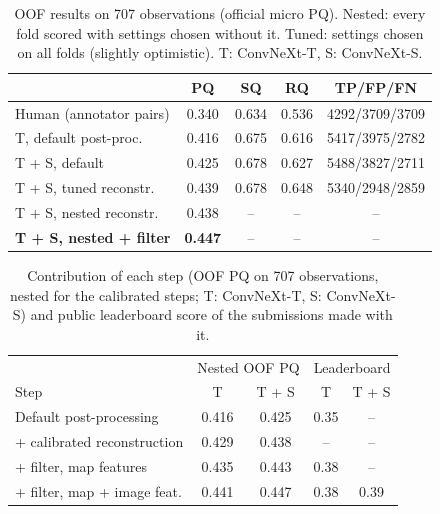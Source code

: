 \begin{table}[t]
  \caption{OOF results on 707 observations (official micro PQ). Nested:
  every fold scored with settings chosen without it. Tuned: settings chosen
  on all folds (slightly optimistic). T: ConvNeXt-T, S: ConvNeXt-S.}
  \label{tab:main}
  \small
  \setlength{\tabcolsep}{2.5pt}
  \begin{tabular}{lcccc}
    \toprule
    & PQ & SQ & RQ & TP/FP/FN \\
    \midrule
    Human (annotator pairs) & 0.340 & 0.634 & 0.536 & 4292/3709/3709 \\
    T, default post-proc. & 0.416 & 0.675 & 0.616 & 5417/3975/2782 \\
    T + S, default & 0.425 & 0.678 & 0.627 & 5488/3827/2711 \\
    T + S, tuned reconstr. & 0.439 & 0.678 & 0.648 & 5340/2948/2859 \\
    T + S, nested reconstr. & 0.438 & -- & -- & -- \\
    \textbf{T + S, nested + filter} & \textbf{0.447} & -- & -- & -- \\
    \bottomrule
  \end{tabular}
\end{table}

\begin{table}[t]
  \caption{Contribution of each step (OOF PQ on 707 observations, nested
  for the calibrated steps; T: ConvNeXt-T, S: ConvNeXt-S) and public
  leaderboard score of the submissions made with it.}
  \label{tab:steps}
  \small
  \setlength{\tabcolsep}{4pt}
  \begin{tabular}{lcccc}
    \toprule
    & \multicolumn{2}{c}{Nested OOF PQ} & \multicolumn{2}{c}{Leaderboard} \\
    Step & T & T + S & T & T + S \\
    \midrule
    Default post-processing & 0.416 & 0.425 & 0.35 & -- \\
    + calibrated reconstruction & 0.429 & 0.438 & -- & -- \\
    + filter, map features & 0.435 & 0.443 & 0.38 & -- \\
    + filter, map + image feat. & 0.441 & 0.447 & 0.38 & 0.39 \\
    \bottomrule
  \end{tabular}
\end{table}

